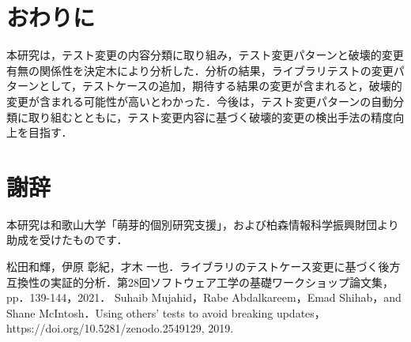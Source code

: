 \documentclass[uplatex,dvipdfmx,a4paper,twocolumn,base=11pt,jbase=11pt,ja=standard]{bxjsarticle}  %
\begin{document}




\section{おわりに}

本研究は，テスト変更の内容分類に取り組み，テスト変更パターンと破壊的変更有無の関係性を決定木により分析した．分析の結果，ライブラリテストの変更パターンとして，テストケースの追加，期待する結果の変更が含まれると，破壊的変更が含まれる可能性が高いとわかった．今後は，テスト変更パターンの自動分類に取り組むとともに，テスト変更内容に基づく破壊的変更の検出手法の精度向上を目指す．

\section*{謝辞}

本研究は和歌山大学「萌芽的個別研究支援」，および柏森情報科学振興財団より助成を受けたものです．

\begin{thebibliography}{10}
   松田和輝，伊原 彰紀，才木 一也．ライブラリのテストケース変更に基づく後方互換性の実証的分析．第28回ソフトウェア工学の基礎ワークショップ論文集，pp．139-144，2021．
   Suhaib Mujahid，Rabe Abdalkareem，Emad Shihab，and Shane McIntosh．Using others’ tests to avoid breaking updates，https://doi.org/10.5281/zenodo.2549129, 2019.
\end{thebibliography}
\end{document}
